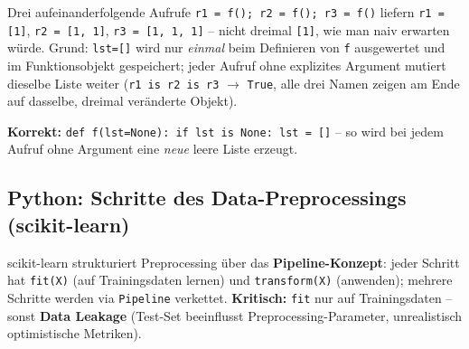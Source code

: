 Drei aufeinanderfolgende Aufrufe \texttt{r1 = f(); r2 = f(); r3 = f()} liefern \texttt{r1 = [1]}, \texttt{r2 = [1, 1]}, \texttt{r3 = [1, 1, 1]} -- nicht dreimal \texttt{[1]}, wie man naiv erwarten würde. Grund: \texttt{lst=[]} wird nur \emph{einmal} beim Definieren von \texttt{f} ausgewertet und im Funktionsobjekt gespeichert; jeder Aufruf ohne explizites Argument mutiert dieselbe Liste weiter (\texttt{r1 is r2 is r3} $\to$ \texttt{True}, alle drei Namen zeigen am Ende auf dasselbe, dreimal veränderte Objekt).

\textbf{Korrekt:} \texttt{def f(lst=None):\ if lst is None:\ lst = []} -- so wird bei jedem Aufruf ohne Argument eine \emph{neue} leere Liste erzeugt.

\newpage

\subsection{Python: Schritte des Data-Preprocessings (scikit-learn)}


scikit-learn strukturiert Preprocessing über das \textbf{Pipeline-Konzept}: jeder Schritt hat \texttt{fit(X)} (auf Trainingsdaten lernen) und \texttt{transform(X)} (anwenden); mehrere Schritte werden via \texttt{Pipeline} verkettet. \textbf{Kritisch:} \texttt{fit} nur auf Trainingsdaten -- sonst \textbf{Data Leakage} (Test-Set beeinflusst Preprocessing-Parameter, unrealistisch optimistische Metriken).

